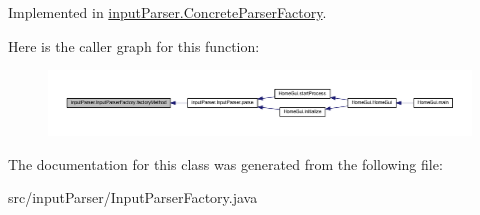 Implemented in \hyperlink{classinput_parser_1_1_concrete_parser_factory_a6fdfbfef9e48417903f60faf67640d1e}{input\-Parser.\-Concrete\-Parser\-Factory}.



Here is the caller graph for this function\-:
\nopagebreak
\begin{figure}[H]
\begin{center}
\leavevmode
\includegraphics[width=350pt]{classinput_parser_1_1_input_parser_factory_a48971c2679b589f34a7051e795d48c49_icgraph}
\end{center}
\end{figure}




The documentation for this class was generated from the following file\-:\begin{DoxyCompactItemize}
\item 
src/input\-Parser/Input\-Parser\-Factory.\-java\end{DoxyCompactItemize}
